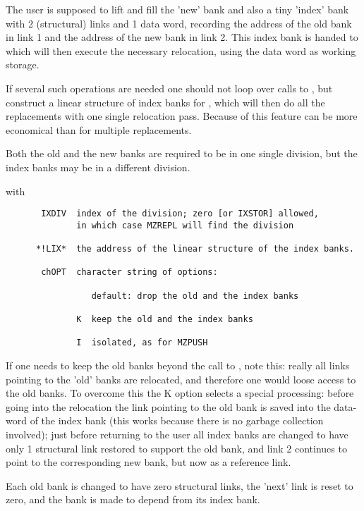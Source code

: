 The user is supposed to lift and fill the 'new' bank and also a
tiny 'index' bank with 2 (structural) links and 1 data word,
recording the address of the old bank in link 1 and the address
of the new bank in link 2.
This index bank is handed to  which will then execute
the necessary relocation, using the data word as working storage.

If several such operations are needed one should not loop
over calls to , but construct a linear structure of
index banks for , which will then do all the replacements
with one single relocation pass.
Because of this feature  can be more economical than
 for multiple replacements.

Both the old and the new banks are required to be in one single
division, but the index banks may be in a different division.


with
\begin{verbatim}
       IXDIV  index of the division; zero [or IXSTOR] allowed,
              in which case MZREPL will find the division

      *!LIX*  the address of the linear structure of the index banks.

       chOPT  character string of options:

                 default: drop the old and the index banks

              K  keep the old and the index banks

              I  isolated, as for MZPUSH
\end{verbatim} 

If one needs to keep the old banks beyond the call to ,
note this: really all links pointing to the 'old' banks are
relocated, and therefore one would loose access to the old banks.
To overcome this the K option selects a special processing:
before going into the relocation the link pointing to the
old bank is saved into the data-word of the index bank
(this works because there is no garbage collection involved);
just before returning to the user all index banks are changed
to have only 1 structural link restored to support the old bank,
and link 2 continues to point to the corresponding new bank,
but now as a reference link.

Each old bank is changed to have zero structural links,
the 'next' link is reset to zero, and the bank is made to
depend from its index bank.

